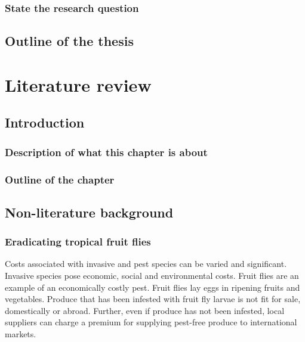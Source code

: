 \documentclass[
]{book}
\begin{document}
\hypertarget{state-the-research-question}{%
\subsection{State the research question}\label{state-the-research-question}}

\hypertarget{outline-of-the-thesis}{%
\section{Outline of the thesis}\label{outline-of-the-thesis}}

\hypertarget{lit-review}{%
\chapter{Literature review}\label{lit-review}}

\hypertarget{introduction-1}{%
\section{Introduction}\label{introduction-1}}

\hypertarget{description-of-what-this-chapter-is-about}{%
\subsection{Description of what this chapter is about}\label{description-of-what-this-chapter-is-about}}

\hypertarget{outline-of-the-chapter}{%
\subsection{Outline of the chapter}\label{outline-of-the-chapter}}

\hypertarget{non-literature-background}{%
\section{Non-literature background}\label{non-literature-background}}

\hypertarget{eradicating-tropical-fruit-flies}{%
\subsection{Eradicating tropical fruit flies}\label{eradicating-tropical-fruit-flies}}

Costs associated with invasive and pest species can be varied and significant. Invasive species pose economic, social and environmental costs. Fruit flies are an example of an economically costly pest. Fruit flies lay eggs in ripening fruits and vegetables. Produce that has been infested with fruit fly larvae is not fit for sale, domestically or abroad. Further, even if produce has not been infested, local suppliers can charge a premium for supplying pest-free produce to international markets.
\end{document}
